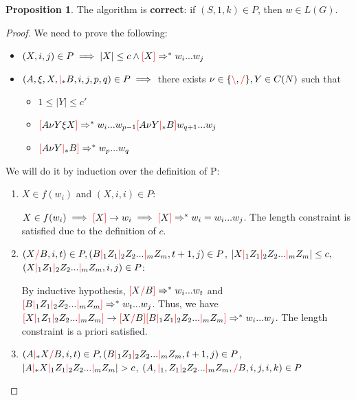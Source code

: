 \documentclass[12pt]{extarticle}
\theoremstyle{definition} \newtheorem{defn}{Definition}
\theoremstyle{definition} \newtheorem{prop}{Proposition}
\theoremstyle{definition} \newtheorem{property}{Property}
\newcommand{\lc}{\textcolor{red}{\backslash}}
\newcommand{\rc}{\textcolor{red}{/}}
\newcommand{\mc}{\textcolor{red}{|}}
\newcommand{\lb}{\textcolor{red}{[}}
\newcommand{\rb}{\textcolor{red}{]}}
\begin{document}
\begin{prop}
    The algorithm is \textbf{correct}: if $(S, 1, k) \in P$, then $w \in L(G)$.
\end{prop}
\begin{proof}
    We need to prove the following:

    \begin{itemize}
        \item $(X, i, j) \in P \implies |X| \leq c \land \lb X \rb \Rightarrow^* w_i ... w_j$
        \item $(A, \xi, X, \mc_* B, i, j, p, q) \in P \implies$
            there exists $\nu \in \{ \lc, \rc \}, Y \in C(N)$ such that
            \begin{itemize}
                \item $1 \leq |Y| \leq c'$
                \item $\lb A \nu Y \xi X \rb \Rightarrow^* w_i ... w_{p - 1} \lb A \nu Y \mc_* B \rb w_{q + 1} ... w_j$
                \item $\lb A \nu Y \mc_* B \rb \Rightarrow^* w_p ... w_q$
            \end{itemize}
    \end{itemize}

    We will do it by induction over the definition of P:

    \begin{enumerate}
    \item $X \in f(w_i)$ and $(X, i, i) \in P$:

        $X \in f(w_i) \implies \lb X \rb \rightarrow w_i \implies \lb X \rb \Rightarrow^* w_i = w_i ... w_j$.
        The length constraint is satisfied due to the definition of $c$.

    \item $(X \rc B, i, t) \in P, (B \mc_1 Z_1 \mc_2 Z_2 ... \mc_m Z_m, t + 1, j) \in P$,
        $|X \mc_1 Z_1 \mc_2 Z_2 ... \mc_m Z_m| \leq c,$
        $(X \mc_1 Z_1 \mc_2 Z_2 ... \mc_m Z_m, i, j) \in P$:

        By inductive hypothesis, $\lb X \rc B \rb \Rightarrow^* w_i ... w_t$
        and $\lb B \mc_1 Z_1 \mc_2 Z_2 ... \mc_m Z_m \rb \Rightarrow^* w_t ... w_j$.
        Thus, we have $\lb X \mc_1 Z_1 \mc_2 Z_2 ... \mc_m Z_m \rb \rightarrow
        \lb X \rc B \rb \lb B \mc_1 Z_1 \mc_2 Z_2 ... \mc_m Z_m \rb
        \Rightarrow^* w_i ... w_j$. The length constraint is a priori satisfied.

    \item $(A \mc_* X \rc B, i, t) \in P, (B \mc_1 Z_1 \mc_2 Z_2 ... \mc_m Z_m, t + 1, j) \in P$,
        $|A \mc_* X \mc_1 Z_1 \mc_2 Z_2 ... \mc_m Z_m| > c$,
        $(A, \mc_1, Z_1 \mc_2 Z_2 ... \mc_m Z_m, \rc B, i, j, i, k) \in P$


\end{enumerate}
\end{proof}
\end{document}
